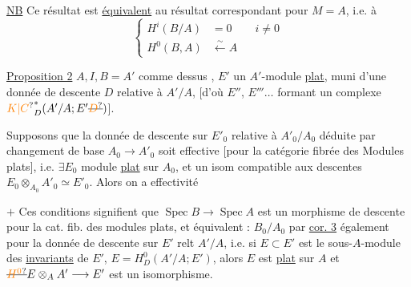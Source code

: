 \uline{NB} \quad Ce résultat est \uline{équivalent} au résultat correspondant pour $M=A$, i.e. à
\[
\left\{\begin{aligned}H^i(B/A)&=0 &&i\ne0\\
H^0(B,A)&\xleftarrow{\sim}A\end{aligned}\right.
\]

\uline{Proposition 2} \quad $A,I,B=A'$ comme dessus  , $E'$ un $A'$-module \uline{plat}, muni d'une donnée de descente $D$ relative à $A'/A$, [d'où $E''$, $E'''\ldots$ formant un complexe $\unsure{K|C}_D^*(A'/A;E'\deleted{\unsure{D}})$].


Supposons que la donnée de descente sur $E'_0$ relative à $A'_0/A_0$ déduite par changement de base $A_0\longrightarrow A'_0$ soit effective [pour la catégorie fibrée des Modules plats], i.e. $\exists E_0$ module \uline{plat} sur $A_0$, et un isom compatible aux descentes $E_0\otimes_{A_0}A'_0\simeq E'_0$. Alors on a effectivité

\textcircled{$+$} Ces conditions  signifient que $\operatorname{Spec}B\longrightarrow\operatorname{Spec}A$ est un morphisme de descente pour la cat. fib. des modules plats, et équivalent :  $B_0/A_0$ par \uline{cor. 3}
également pour la donnée de descente sur $E'$ relt $A'/A$, i.e. si $E\subset E'$ est le sous-$A$-module des \uline{invariants} de $E'$, $E=H^0_D(A'/A;E')$, alors $E$ est \uline{plat} sur $A$ et $\deleted{\unsure{H^0}}E\otimes_A A'\longrightarrow E'$ est un isomorphisme.


